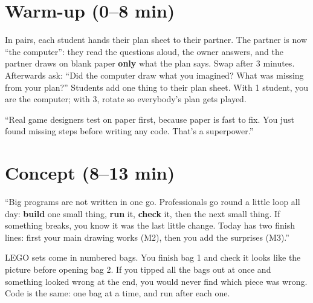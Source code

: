 \section{Warm-up (0--8 min)}
\begin{unplugged}
In pairs, each student hands their plan sheet to their partner. The partner is now \enquote{the computer}: they read the questions aloud, the owner answers, and the partner draws on blank paper \textbf{only} what the plan says. Swap after 3 minutes.
Afterwards ask: \enquote{Did the computer draw what you imagined? What was missing from your plan?} Students add one thing to their plan sheet. With 1 student, you are the computer; with 3, rotate so everybody's plan gets played.
\end{unplugged}
\begin{teacherscript}
\enquote{Real game designers test on paper first, because paper is fast to fix. You just found missing steps before writing any code. That's a superpower.}
\end{teacherscript}

\section{Concept (8--13 min)}
\begin{teacherscript}
\enquote{Big programs are not written in one go. Professionals go round a little loop all day: \textbf{build} one small thing, \textbf{run} it, \textbf{check} it, then the next small thing. If something breaks, you know it was the last little change. Today has two finish lines: first your main drawing works (M2), then you add the surprises (M3).}
\end{teacherscript}
\begin{analogy}
LEGO sets come in numbered bags. You finish bag 1 and check it looks like the picture before opening bag 2. If you tipped all the bags out at once and something looked wrong at the end, you would never find which piece was wrong. Code is the same: one bag at a time, and run after each one.
\end{analogy}

